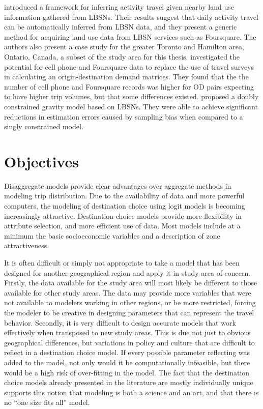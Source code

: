 \textcite{abdulazim2015framework} introduced a framework for inferring activity travel given nearby land use information gathered from LBSNs. Their results suggest that daily activity travel can be automatically inferred from LBSN data, and they present a generic method for acquiring land use data from LBSN services such as Foursquare. The authors also present a case study for the  greater Toronto and Hamilton area, Ontario, Canada, a subset of the study area for this thesis. \textcite{sa2015origin} investigated the potential for cell phone and Foursquare data to replace the use of travel surveys in calculating an origin-destination demand matrices. They found that the the number of cell phone and Foursquare records was higher for OD pairs expecting to have higher trip volumes, but that some differences existed.
\textcite{jin2014location} proposed a doubly constrained gravity model based on LBSNs. They were able to achieve significant reductions in estimation errors caused by sampling bias when compared to a singly constrained model.

\section{Objectives}
Disaggregate models provide clear advantages over aggregate methods in modeling trip distribution. Due to the availability of data and more powerful computers, the modeling of destination choice using logit models is becoming increasingly attractive. Destination choice models provide more flexibility in attribute selection, and more efficient use of data. Most models include at a minimum the basic socioeconomic variables and a description of zone attractiveness. 

It is often difficult or simply not appropriate to take a model that has been designed for another geographical region and apply it in study area of concern. Firstly, the data available for the study area will most likely be different to those available for other study areas. The data may provide more variables that were not available to modelers working in other regions, or be more restricted, forcing the modeler to be creative in designing parameters that can represent the travel behavior. Secondly, it is very difficult to design accurate models that work effectively when transposed to new study areas. This is due not just to obvious geographical differences, but variations in policy and culture that are difficult to reflect in a destination choice model. If every possible parameter reflecting was added to the model, not only would it be computationally infeasible, but there would be a high risk of over-fitting in the model. The fact that the destination choice models already presented in the literature are mostly individually unique supports this notion that modeling is both a science and an art, and that there is no \enquote{one size fits all} model.

